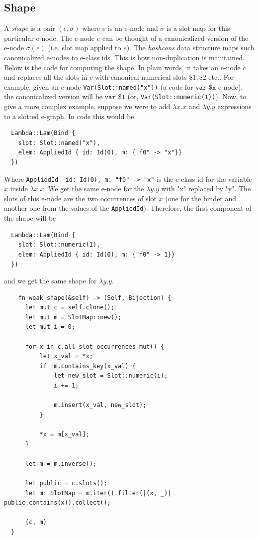 \documentclass[acmsmall,screen, nonacm, anonymous]{acmart}
\begin{document}
\subsection{Shape}

A \textit{shape} is a pair $(e, \sigma)$ where $e$ is an e-node and $\sigma$ is a slot map for this particular e-node.
The e-node $e$ can be thought of a canonicalized version of the e-node $\sigma(e)$ (i.e. slot map applied to $e$). The \textit{hashcons} data structure maps such canonicalized e-nodes to e-class ids.
This is how non-duplication is maintained.
Below is the code for computing the shape.
In plain words, it takes an e-node $c$ and replaces all the slots in $c$ with canonical numerical slots $\$1, \$2$ etc..
For example, given an e-node \texttt{Var(Slot::named("x"))} (a code for $\texttt{var \$x}$ e-node), the canonicalized version will be $\texttt{var \$1}$ (or, \texttt{Var(Slot::numeric(1))}).
Now, to give a more complex example, suppose we were to add $\lambda x . x$ and $\lambda y . y$ expressions to a slotted e-graph.
In code this would be 
\begin{verbatim}
  Lambda::Lam(Bind { 
    slot: Slot::named("x"),
    elem: AppliedId { id: Id(0), m: {"f0" -> "x"}}
  })
\end{verbatim}

Where \texttt{AppliedId { id: Id(0), m: {"f0" -> "x"}}} is the e-class id for the variable $x$ inside $\lambda x . x$.
We get the same e-node for the $\lambda y . y$ with "x" replaced by "y".
The slots of this e-node are the two occurrences of slot $x$ (one for the binder and another one from the values of the \texttt{AppliedId}).
Therefore, the first component of the shape will be

\begin{verbatim}
  Lambda::Lam(Bind { 
    slot: Slot::numeric(1),
    elem: AppliedId { id: Id(0), m: {"f0" -> 1}}
  })
\end{verbatim}

and we get the same shape for $\lambda y . y$.


\begin{listing}
  \begin{verbatim}
    fn weak_shape(&self) -> (Self, Bijection) {
      let mut c = self.clone();
      let mut m = SlotMap::new();
      let mut i = 0;

      for x in c.all_slot_occurrences_mut() {
          let x_val = *x;
          if !m.contains_key(x_val) {
              let new_slot = Slot::numeric(i);
              i += 1;

              m.insert(x_val, new_slot);
          }

          *x = m[x_val];
      }

      let m = m.inverse();

      let public = c.slots();
      let m: SlotMap = m.iter().filter(|(x, _)| public.contains(x)).collect();

      (c, m)
  }
  \end{verbatim}
\end{listing}
  
\end{document}
